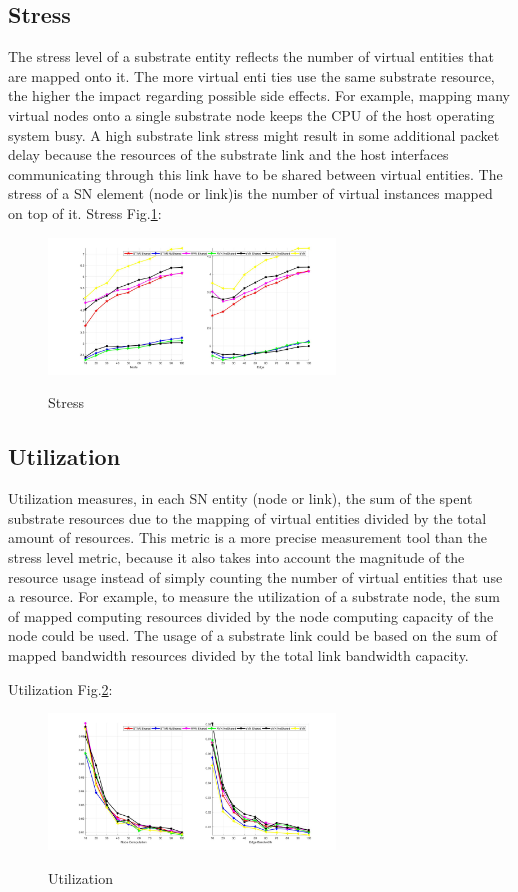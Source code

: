 \subsection{Stress}
The stress level of a substrate entity reflects the number of virtual entities that are mapped onto it. The more virtual enti ties use the same substrate resource, the higher the impact regarding possible side effects. For example, mapping many virtual nodes onto a single substrate node keeps the CPU of the host operating system busy. A high substrate link stress might result in some additional packet delay because the resources of the substrate link and the host interfaces communicating through this link have to be shared
between virtual entities.
The stress of a SN element (node or link)is the number of virtual instances mapped on top of it.
Stress Fig.\ref{fig:Stress}:
\begin{figure}[htbp]
  \centering
  \includegraphics[width=3in]{Fig/Stress}\\
  \caption{Stress}\label{fig:Stress}
\end{figure}


\subsection{Utilization}
Utilization measures, in each SN entity (node or link), the sum of the spent substrate resources due to the mapping of virtual entities divided by the total amount of resources. This metric is a more precise measurement tool than
the stress level metric, because it also takes into account the magnitude of the resource usage instead of simply counting the number of virtual entities that use a resource. For example, to measure the utilization of a substrate node, the sum of mapped computing resources divided by the node computing capacity of the node could be used. The usage of a substrate link could be based on the sum of mapped bandwidth resources divided by the total link bandwidth capacity.

Utilization Fig.\ref{fig:Utilization}:
\begin{figure}[htbp]
  \centering
  \includegraphics[width=3in]{Fig/Utilization}\\
  \caption{Utilization}\label{fig:Utilization}
\end{figure}



